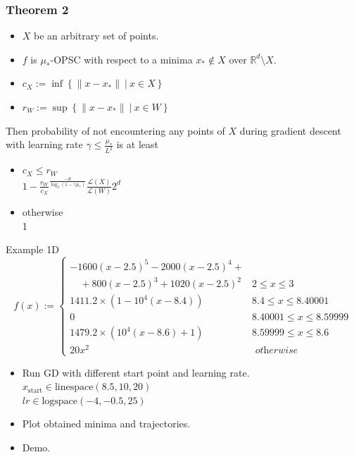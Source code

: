 \documentclass{beamer}
\begin{document}
\begin{frame}
\frametitle{Theorem 2}
\begin{itemize}
	\item $X$ be an arbitrary set of points.
	\item $f$ is $\mu_\ast$-OPSC with respect to a minima 
	$x_\ast \notin X$ over $\mathbb{R}^d \setminus X$.
	\item $c_X := \inf \left\{ \| x - x_\ast \| \:|\: x \in X  \right\}$
	\item $r_W := \sup \left\{ \| x - x_\ast \| \:|\: x \in W \right\}$
	
\end{itemize}
Then probability of not encountering any points of $X$ during 
gradient descent with learning rate $\gamma \leq \frac{\mu_\ast}{L^2}$ is at least

\begin{itemize}
	\item $c_X \leq r_W$ \\
	$1 - \frac{r_W}{c_X}^{\frac{-d}{\log_2(1 - \gamma \mu_\ast)}} \frac{\mathcal{L}(X)}{\mathcal{L}(W)} 2^d$
	\item otherwise \\
	1
\end{itemize}

\end{frame}



\begin{frame}{Example 1D}
    $$
    f(x):= \begin{cases}        
            -1600(x-2.5)^5-2000(x-2.5)^4 + \\
            \quad +800(x-2.5)^3+1020(x-2.5)^2
        & 2 \leq x \leq 3 \\ 
        1411.2 \times\left(1-10^4(x-8.4)\right) & 8.4 \leq x \leq 8.40001 \\ 
        0 & 8.40001 \leq x \leq 8.59999 \\ 
        1479.2 \times\left(10^4(x-8.6)+1\right) & 8.59999 \leq x \leq 8.6 \\ 
        20 x^2 & \textit{ otherwise }
    \end{cases}
    $$
    
    \begin{itemize}
    	\item Run GD with different start point and learning rate. \\
    	$x_{\text{start}} \in \text{linespace}(8.5, 10, 20)$ \\
    	$lr \in \text{logspace}(-4, -0.5, 25)$
    	\item Plot obtained minima and trajectories.
    	\item Demo.
    \end{itemize}
    

\end{frame}
\end{document}
